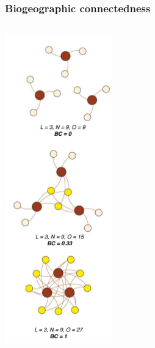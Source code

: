 \documentclass{beamer}
\begin{document}
\begin{frame}
  \frametitle{Biogeographic connectedness}

  \begin{columns}
    \begin{column}{0.5\textwidth}
      \begin{center}
        \includegraphics[height=0.8\textheight,width=\textwidth,keepaspectratio=true]{figure/bc}


\end{center}
\end{column}
\end{columns}
\end{frame}
\end{document}
